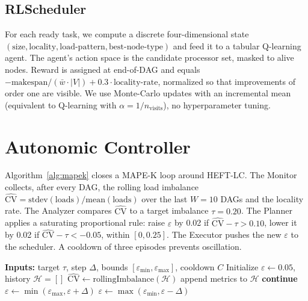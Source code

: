 \documentclass[conference]{IEEEtran}
\begin{document}
\subsection{RLScheduler}
For each ready task, we compute a discrete four-dimensional state
\((\text{size}, \text{locality}, \text{load-pattern}, \text{best-node-type})\)
and feed it to a tabular Q-learning agent. The agent's action space is the
candidate processor set, masked to alive nodes. Reward is assigned at
end-of-DAG and equals \(-\text{makespan} / (\bar w \cdot |V|) + 0.3
\cdot \text{locality-rate}\), normalized so that improvements of order one
are visible.  We use Monte-Carlo updates with an incremental mean
(equivalent to Q-learning with \(\alpha = 1/n_{\text{visits}}\)), no
hyperparameter tuning.

\section{Autonomic Controller}

Algorithm~\ref{alg:mapek} closes a MAPE-K loop around HEFT-LC. The Monitor
collects, after every DAG, the rolling load imbalance
\(\hat{\text{CV}} = \text{stdev}(\text{loads}) / \text{mean}(\text{loads})\)
over the last \(W=10\) DAGs and the locality rate. The Analyzer compares
\(\hat{\text{CV}}\) to a target imbalance \(\tau=0.20\). The Planner applies
a saturating proportional rule: raise \(\varepsilon\) by 0.02 if
\(\hat{\text{CV}} - \tau > 0.10\), lower it by 0.02 if
\(\hat{\text{CV}} - \tau < -0.05\), within \([0, 0.25]\). The Executor pushes
the new \(\varepsilon\) to the scheduler. A cooldown of three episodes
prevents oscillation.

\begin{algorithm}[t]
\caption{MAPE-K controller for HEFT-LC's \(\varepsilon\)}\label{alg:mapek}
\begin{algorithmic}[1]
\State \textbf{Inputs:} target \(\tau\), step \(\Delta\), bounds
       \([\varepsilon_{\min},\varepsilon_{\max}]\), cooldown \(C\)
\State Initialize \(\varepsilon \leftarrow 0.05\), history \(\mathcal{H} = []\)
  \State \(\hat{\text{CV}} \leftarrow \text{rollingImbalance}(\mathcal{H})\)
  \State append metrics to \(\mathcal{H}\)
   \textbf{continue} \EndIf
     \State \(\varepsilon \leftarrow \min(\varepsilon_{\max}, \varepsilon + \Delta)\)
     \State \(\varepsilon \leftarrow \max(\varepsilon_{\min}, \varepsilon - \Delta)\)
  \EndIf
\EndFor
\end{algorithmic}
\end{algorithm}
\end{document}
